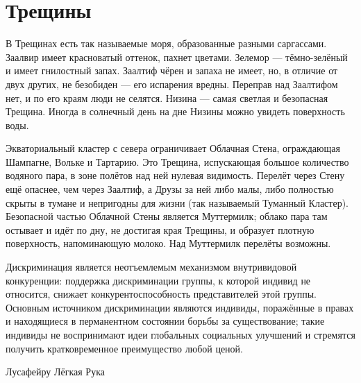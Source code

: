 \section{Трещины}

В Трещинах есть так называемые моря, образованные разными саргассами.
Заалвир имеет красноватый оттенок, пахнет цветами.
Зелемор --- тёмно-зелёный и имеет гнилостный запах.
Заалтиф чёрен и запаха не имеет, но, в отличие от двух других, не безобиден --- его испарения вредны.
Переправ над Заалтифом нет, и по его краям люди не селятся.
Низина --- самая светлая и безопасная Трещина.
Иногда в солнечный день на дне Низины можно увидеть поверхность воды.

Экваториальный кластер с севера ограничивает Облачная Стена, ограждающая Шампагне, Вольке и Тартарию.
Это Трещина, испускающая большое количество водяного пара, в зоне полётов над ней нулевая видимость.
Перелёт через Стену ещё опаснее, чем через Заалтиф, а Друзы за ней либо малы, либо полностью скрыты в тумане и непригодны для жизни (так называемый Туманный Кластер).
Безопасной частью Облачной Стены является Муттермилк;
облако пара там остывает и идёт по дну, не достигая края Трещины, и образует плотную поверхность, напоминающую молоко.
Над Муттермилк перелёты возможны.



\epigraph{
Дискриминация является неотъемлемым механизмом внутривидовой конкуренции: поддержка дискриминации группы, к которой индивид не относится, снижает конкурентоспособность представителей этой группы.
Основным источником дискриминации являются индивиды, поражённые в правах и находящиеся в перманентном состоянии борьбы за существование;
такие индивиды не воспринимают идеи глобальных социальных улучшений и стремятся получить кратковременное преимущество любой ценой.
}{Лусафейру Лёгкая Рука}

